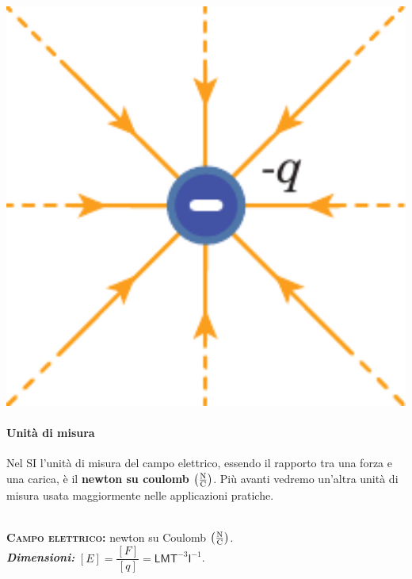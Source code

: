 \begin{define}
\begin{center}
\begin{minipage}{0.45\textwidth}
\begin{center}
			\end{center}
		\end{minipage}
			\hspace{5pt}
		\begin{minipage}{0.45\textwidth}
			\begin{center}
				\includegraphics[width=1\textwidth]{images/chp1/chp1campocoulomb2.pdf}
			\end{center}
		\end{minipage}
	\end{center}
\end{define}
\paragraph{Unità di misura}
Nel SI l'unità di misura del campo elettrico, essendo il rapporto tra una forza e una carica, è il \textbf{newton su coulomb} $\left(\unit[per-mode = fraction]{\newton\per\coulomb}\right)$. Più avanti vedremo un'altra unità di misura usata maggiormente nelle applicazioni pratiche.
\begin{units}~\\
	\textbf{\textsc{Campo elettrico:}} newton su Coulomb $\left(\unit[per-mode = fraction]{\newton\per\coulomb}\right)$.\\
	\textit{\textbf{Dimensioni:}} $[E]=\dfrac{[F]}{[q]}=\mathsf{L}\mathsf{M}\mathsf{T}^{-3}\mathsf{I}^{-1}$.
\end{units}
